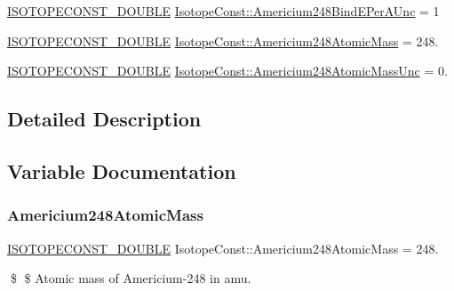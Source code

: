 \begin{DoxyCompactItemize}
\mbox{\hyperlink{group___isotope_const-_macros_ga8f45a7272ce02c0b4c65c44636ed719a}{I\+S\+O\+T\+O\+P\+E\+C\+O\+N\+S\+T\+\_\+\+D\+O\+U\+B\+LE}} \mbox{\hyperlink{group___isotope_const-_americium-_am248_gac1c82d00aa7ba8c0ac836ce7bd6a246d}{Isotope\+Const\+::\+Americium248\+Bind\+E\+Per\+A\+Unc}} = 1
\item 
\mbox{\hyperlink{group___isotope_const-_macros_ga8f45a7272ce02c0b4c65c44636ed719a}{I\+S\+O\+T\+O\+P\+E\+C\+O\+N\+S\+T\+\_\+\+D\+O\+U\+B\+LE}} \mbox{\hyperlink{group___isotope_const-_americium-_am248_gab8553d33de8790c9ee5217873b08663d}{Isotope\+Const\+::\+Americium248\+Atomic\+Mass}} = 248.
\item 
\mbox{\hyperlink{group___isotope_const-_macros_ga8f45a7272ce02c0b4c65c44636ed719a}{I\+S\+O\+T\+O\+P\+E\+C\+O\+N\+S\+T\+\_\+\+D\+O\+U\+B\+LE}} \mbox{\hyperlink{group___isotope_const-_americium-_am248_ga93838f32da0325414046264364409d6c}{Isotope\+Const\+::\+Americium248\+Atomic\+Mass\+Unc}} = 0.
\end{DoxyCompactItemize}


\subsection{Detailed Description}


\subsection{Variable Documentation}
\mbox{\label{group___isotope_const-_americium-_am248_gab8553d33de8790c9ee5217873b08663d}} 
\subsubsection{\texorpdfstring{Americium248\+Atomic\+Mass}{Americium248AtomicMass}}
{\footnotesize\ttfamily \mbox{\hyperlink{group___isotope_const-_macros_ga8f45a7272ce02c0b4c65c44636ed719a}{I\+S\+O\+T\+O\+P\+E\+C\+O\+N\+S\+T\+\_\+\+D\+O\+U\+B\+LE}} Isotope\+Const\+::\+Americium248\+Atomic\+Mass = 248.}

\$ \$ Atomic mass of Americium-\/248 in amu. \mbox{\label{group___isotope_const-_americium-_am248_ga93838f32da0325414046264364409d6c}} 
